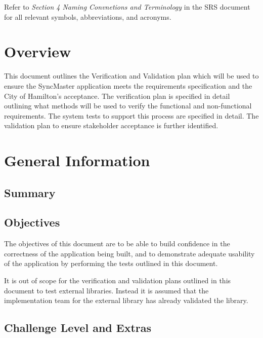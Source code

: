 \documentclass[12pt, titlepage]{article}
\begin{document}
Refer to \textit{Section 4 Naming Convnetions and Terminology} in the
SRS document\citep{SRS} for all relevant symbols, abbreviations, and acronyms.

\newpage


\section{Overview}

This document outlines the Verification and Validation plan which will be used
to ensure the SyncMaster application meets the requirements specification
and the City of Hamilton's acceptance. The verification plan is specified
in detail outlining what methods will be used to verify the
functional and non-functional
requirements. The system tests to support this process are specified in detail.
The validation plan to ensure stakeholder acceptance is further identified.

\section{General Information}

\subsection{Summary}


\subsection{Objectives}

The objectives of this document are to be able to build confidence in
the correctness of the application being built, and to demonstrate
adequate usability of the application by performing the tests
outlined in this document.

It is out of scope for the verification and validation plans outlined
in this document to test external libraries. Instead it is assumed
that the implementation team for the external library has already
validated the library.

\subsection{Challenge Level and Extras}
\end{document}
